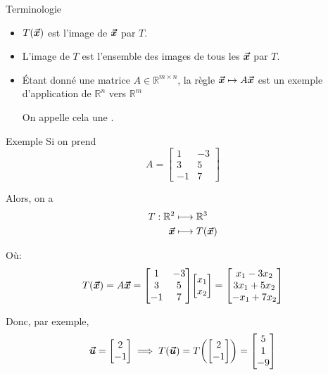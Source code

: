 \documentclass{article}
\begin{document}
\begin{parag}{Terminologie}
    \begin{itemize}[left=0pt]
        \item $T\left(\bvec{x}\right)$ est l'image de $\bm{\protect\vec{x}}$ par $T$.
        \item L'image de $T$ est l'ensemble des images de tous les $\bm{\protect\vec{x}}$ par $T$.
        \item Étant donné une matrice $A \in \mathbb{R}^{m\times n}$, la règle $\bm{\protect\vec{x}} \mapsto A \bm{\protect\vec{x}}$ est un exemple d'application de $\mathbb{R}^{n}$ vers $\mathbb{R}^{m}$

         On appelle cela une .
    \end{itemize}

\end{parag}

\begin{parag}{Exemple}
    Si on prend
    \[A = \begin{bmatrix} 1 & -3 \\ 3 & 5 \\ -1 & 7 \end{bmatrix} \]

    Alors, on a
    \[\begin{split}
    T: \mathbb{R}^{2} &\longmapsto \mathbb{R}^{3} \\
    \bvec{x} &\longmapsto T\left(\bvec{x}\right)
    \end{split}\]

    Où:
    \[T\left(\bvec{x}\right) = A \bvec{x} = \begin{bmatrix} 1 & -3 \\ 3 & 5 \\ -1 & 7 \end{bmatrix} \begin{bmatrix} x_1 \\ x_2 \end{bmatrix} = \begin{bmatrix} x_1 - 3x_2 \\ 3x_1 + 5x_2 \\ -x_1 + 7x_2 \end{bmatrix} \]

    Donc, par exemple,
    \[\bvec{u} = \begin{bmatrix} 2 \\ -1 \end{bmatrix} \implies T\left(\bvec{u}\right) = T\left(\begin{bmatrix} 2 \\ -1 \end{bmatrix}\right) = \begin{bmatrix} 5 \\ 1 \\ -9 \end{bmatrix} \]


\end{parag}
\end{document}
